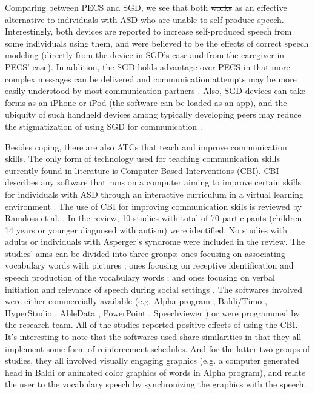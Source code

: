 \documentclass{ut-thesis}
\providecommand{\DIFaddtex}[1]{{\protect\color{blue}\uwave{#1}}} %
\providecommand{\DIFdeltex}[1]{{\protect\color{red}\sout{#1}}}                      %
\providecommand{\DIFaddbegin}{} %
\providecommand{\DIFaddend}{} %
\providecommand{\DIFdelbegin}{} %
\providecommand{\DIFdelend}{} %
\providecommand{\DIFadd}[1]{\texorpdfstring{\DIFaddtex{#1}}{#1}} %
\providecommand{\DIFdel}[1]{\texorpdfstring{\DIFdeltex{#1}}{}} %
\begin{document}
Comparing between PECS and SGD, we see that both \DIFdelbegin \DIFdel{works }\DIFdelend \DIFaddbegin \DIFadd{work }\DIFaddend as an effective alternative to individuals with ASD who are unable to self-produce speech.  Interestingly, both devices are reported to increase self-produced speech from some individuals using them, and were believed to be the effects of correct speech modeling (directly from the device in SGD's case and from the caregiver in PECS' case).  In addition, the SGD holds advantage over PECS in that more complex messages can be delivered and communication attempts may be more easily understood by most communication partners \cite{mirenda2001autism}.  Also, SGD devices can take forms as an iPhone or iPod (the software can be loaded as an app), and the ubiquity of such handheld devices among typically developing peers may reduce the stigmatization of using SGD for communication \cite{kagohara2013using}.

Besides coping, there are also ATCs that teach and improve communication skills.  The only form of technology used for teaching communication skills currently found in literature is Computer Based Interventions (CBI).  CBI describes any software that runs on a computer aiming to improve certain skills for individuals with ASD through an interactive curriculum in a virtual learning environment \cite{lang2014assistive}.  The use of CBI for improving communication skils is reviewed by Ramdoss et al. \cite{ramdoss2011use}.  In the review, 10 studies with total of 70 participants (children 14 years or younger diagnosed with autism) were identified.  No studies with adults or individuals with Asperger's syndrome were included in the review.  The studies' aims can be divided into three groups: ones focusing on associating vocabulary words with pictures \cite{moore2000brief, hetzroni2005logos}; ones focusing on receptive identification and speech production of the vocabulary words \cite{heimann1995increasing, bernard1999enhancing, bosseler2003development, coleman2005using, massaro2006read}; and ones focusing on verbal initiation and relevance of speech during social settings \cite{parsons1993effect, simpson2004embedded, hetzroni2004effects}.  The softwares involved were either commercially available (e.g. Alpha program \cite{abledata2010alpha}, Baldi/Timo \cite{2005team}, HyperStudio \cite{mackiev2010welcome}, AbleData \cite{abledata2010alpha}, PowerPoint \cite{1997microsoft}, Speechviewer \cite{synapse2010the}) or were programmed by the research team.  All of the studies reported positive effects of using the CBI.  It's interesting to note that the softwares used share similarities in that they all implement some form of reinforcement schedules.  And for the latter two groups of studies, they all involved visually engaging graphics (e.g. a computer generated head in Baldi or animated color graphics of words in Alpha program), and relate the user to the vocabulary speech by synchronizing the graphics with the speech.
\end{document}
